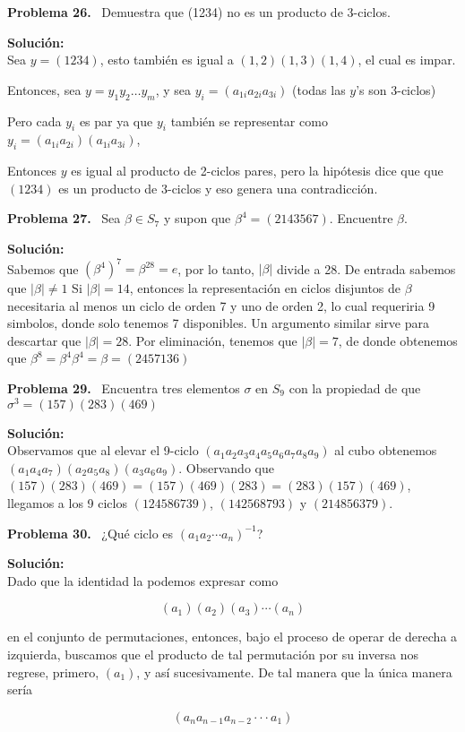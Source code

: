 \documentclass{article}
\newcounter{problem}
\newcounter{solution}
\newcommand\Problem[1]{%
  \stepcounter{problem}%
  \textbf{Problema #1.}~%
  \setcounter{solution}{0}%
}
\newcommand\TheSolution{%
  \textbf{Solución:}\\%
}
\begin{document}
\Problem{26} Demuestra que (1234) no es un producto de 3-ciclos.

\TheSolution{}
Sea $y=(1234)$, esto también es igual a $(1,2)(1,3)(1,4)$, el cual es impar.

Entonces, sea $y = y_1y_2\dots y_m$, y sea $y_i = (a_{1i}a_{2i}a_{3i})$ (todas
las $y$'s son 3-ciclos)

Pero cada $y_i$ es par ya que $y_i$ tambi\'en se representar como $y_i = (a_
{1i}a_{2i})(a_{1i}a_{3i})$,

Entonces $y$ es igual al producto de 2-ciclos pares, pero la hip\'otesis dice
que que $(1234)$ es un producto de 3-ciclos y eso genera una contradicci\'on.

\Problem{27} Sea $\beta \in S_7$ y supon que $\beta^4 = (2143567)$. Encuentre
$\beta$.

\TheSolution{}
Sabemos que ${(\beta^4)}^7 = \beta^{28} = e$, por lo tanto, $|\beta|$ divide a
28. De entrada sabemos que $|\beta| \neq 1$ Si $|\beta| = 14$, entonces la
representación en ciclos disjuntos de $\beta$ necesitaria al menos un ciclo de
orden 7 y uno de orden 2, lo cual requeriria 9 simbolos, donde solo tenemos 7
disponibles. Un argumento similar sirve para descartar que $|\beta| = 28$.
Por eliminación, tenemos que $|\beta| = 7$, de donde obtenemos que $\beta^8 =
\beta^4 \beta^4 = \beta = (2457136)$




\Problem{29} Encuentra tres elementos $\sigma$ en $S_9$ con la propiedad de
que $\sigma^3 = (157)(283)(469)$

\TheSolution{} Observamos que al elevar el 9-ciclo $(a_1 a_2 a_3 a_4 a_5 a_6
a_7 a_8 a_9)$ al cubo obtenemos $(a_1 a_4 a_7)(a_2 a_5 a_8)(a_3 a_6 a_9)$.
Observando que $(157)(283)(469) = (157)(469)(283) = (283)(157)(469)$, llegamos
a los 9 ciclos $(124586739)$, $(142568793)$ y $(214856379)$.

\Problem{30} ¿Qué ciclo es ${(a_{1}a_{2}\cdots a_{n})}^{-1}$?

\TheSolution{}
Dado que la identidad la podemos expresar como

\[(a_{1})(a_{2})(a_{3})\cdots (a_{n})\]

en el conjunto de permutaciones, entonces, bajo el proceso de operar de
derecha a izquierda, buscamos que el producto de tal permutación por su
inversa nos regrese, primero, $(a_{1})$, y así sucesivamente. De tal manera
que la única manera sería 

\[(a_{n}a_{n-1}a_{n-2}\cdot\cdot\cdot a_{1})\]
\end{document}
